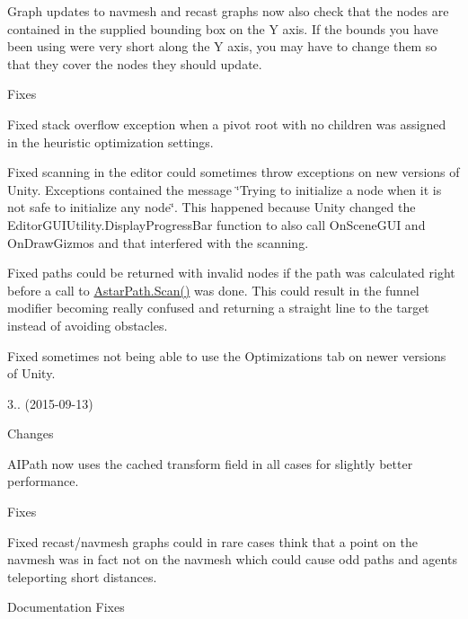 \begin{DoxyItemize}
\begin{DoxyItemize}
\begin{DoxyItemize}
\item Graph updates to navmesh and recast graphs now also check that the nodes are contained in the supplied bounding box on the Y axis. If the bounds you have been using were very short along the Y axis, you may have to change them so that they cover the nodes they should update.
\end{DoxyItemize}
\item Fixes
\begin{DoxyItemize}
\item Fixed stack overflow exception when a pivot root with no children was assigned in the heuristic optimization settings.
\item Fixed scanning in the editor could sometimes throw exceptions on new versions of Unity. Exceptions contained the message \char`\"{}\+Trying to initialize a node when it is not safe to initialize any node\char`\"{}. This happened because Unity changed the Editor\+G\+U\+I\+Utility.\+Display\+Progress\+Bar function to also call On\+Scene\+G\+UI and On\+Draw\+Gizmos and that interfered with the scanning.
\item Fixed paths could be returned with invalid nodes if the path was calculated right before a call to \mbox{\hyperlink{class_astar_path_a9751550dc6954212dcb2e03aecafbcf6}{Astar\+Path.\+Scan()}} was done. This could result in the funnel modifier becoming really confused and returning a straight line to the target instead of avoiding obstacles.
\item Fixed sometimes not being able to use the Optimizations tab on newer versions of Unity.
\end{DoxyItemize}
\end{DoxyItemize}
\item 3.. (2015-\/09-\/13)
\begin{DoxyItemize}
\item Changes
\begin{DoxyItemize}
\item A\+I\+Path now uses the cached transform field in all cases for slightly better performance.
\end{DoxyItemize}
\item Fixes
\begin{DoxyItemize}
\item Fixed recast/navmesh graphs could in rare cases think that a point on the navmesh was in fact not on the navmesh which could cause odd paths and agents teleporting short distances.
\end{DoxyItemize}
\item Documentation Fixes

\end{DoxyItemize}
\end{DoxyItemize}
